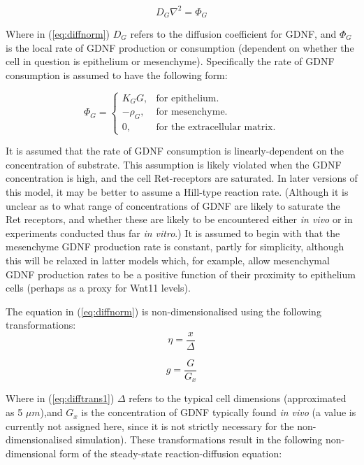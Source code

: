 \documentclass[pdftex,10pt,a4paper]{article}
\begin{document}
\begin{equation}\label{eq:diffnorm}
D_G \nabla^2 = \Phi_G
\end{equation}

Where in (\ref{eq:diffnorm}) $D_G$ refers to the diffusion coefficient for GDNF, and $\Phi_G$ is the local rate of GDNF production or consumption (dependent on whether the cell in question is epithelium or mesenchyme). Specifically the rate of GDNF consumption is assumed to have the following form:

\begin{equation} \label{eq:production}
\Phi_G =\begin{cases}
K_G G, & \text{for epithelium}.\\
-\rho_G, & \text{for mesenchyme}.\\
0, & \text{for the extracellular matrix}.
\end{cases}
\end{equation}

It is assumed that the rate of GDNF consumption is linearly-dependent on the concentration of substrate. This assumption is likely violated when the GDNF concentration is high, and the cell Ret-receptors are saturated. In  later versions of this model, it may be better to assume a Hill-type reaction rate. (Although it is unclear as to what range of concentrations of GDNF are likely to saturate the Ret receptors, and whether these are likely to be encountered either \textit{in vivo} or in experiments conducted thus far \textit{in vitro}.) It is assumed to begin with that the mesenchyme GDNF production rate is constant, partly for simplicity, although this will be relaxed in latter models which, for example, allow mesenchymal GDNF production rates to be a positive function of their proximity to epithelium cells (perhaps as a proxy for Wnt11 levels).

The equation in (\ref{eq:diffnorm}) is non-dimensionalised using the following transformations:
\begin{equation}\label{eq:difftrans1}
\eta = \frac{x}{\Delta}
\end{equation}

\begin{equation}\label{eq:difftrans2}
g = \frac{G}{G_x}
\end{equation}

Where in (\ref{eq:difftrans1}) $\Delta$ refers to the typical cell dimensions (approximated as 5 $\mu m$),and $G_x$ is the concentration of GDNF typically found \textit{in vivo} (a value is currently not assigned here, since it is not strictly necessary for the non-dimensionalised simulation). These transformations result in the following non-dimensional form of the steady-state reaction-diffusion equation:
\end{document}
